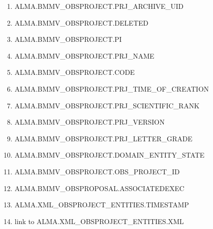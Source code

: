 \documentclass[a4paper,10pt,english]{sphinxmanual}
\begin{document}
\begin{enumerate}
\item {} 
ALMA.BMMV\_OBSPROJECT.PRJ\_ARCHIVE\_UID

\item {} 
ALMA.BMMV\_OBSPROJECT.DELETED

\item {} 
ALMA.BMMV\_OBSPROJECT.PI

\item {} 
ALMA.BMMV\_OBSPROJECT.PRJ\_NAME

\item {} 
ALMA.BMMV\_OBSPROJECT.CODE

\item {} 
ALMA.BMMV\_OBSPROJECT.PRJ\_TIME\_OF\_CREATION

\item {} 
ALMA.BMMV\_OBSPROJECT.PRJ\_SCIENTIFIC\_RANK

\item {} 
ALMA.BMMV\_OBSPROJECT.PRJ\_VERSION

\item {} 
ALMA.BMMV\_OBSPROJECT.PRJ\_LETTER\_GRADE

\item {} 
ALMA.BMMV\_OBSPROJECT.DOMAIN\_ENTITY\_STATE

\item {} 
ALMA.BMMV\_OBSPROJECT.OBS\_PROJECT\_ID

\item {} 
ALMA.BMMV\_OBSPROPOSAL.ASSOCIATEDEXEC

\item {} 
ALMA.XML\_OBSPROJECT\_ENTITIES.TIMESTAMP

\item {} 
link to ALMA.XML\_OBSPROJECT\_ENTITIES.XML

\end{enumerate}
\end{document}
